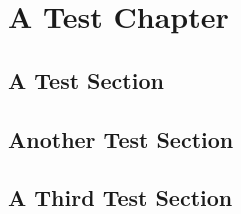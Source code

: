 \newcommand{\thetitle}{The Great Project\\ And How to Typeset it}
\newcommand{\thegroup}{Group XXXX}
\newcommand{\theauthors}{
	Anders Andersen\\
	Anders Andersen\\
	Anders Andersen\\
	Anders Andersen
}
\newcommand{\thesupervisor}{Your Supervisor}
\newcommand{\thestudy}{Your Study}
\newcommand{\thetheme}{Your Theme}
\newcommand{\theprojectperiod}{Spring / Summer}
\newcommand{\deadline}{\today}





\chapter{A Test Chapter}
\lipsum[1]

\section{A Test Section}
\lipsum[2] \parencite{goossens93}

\lipsum[3]

\section{Another Test Section}
\lipsum[4]

\section{A Third Test Section}
\lipsum[5] \parencite{greenwade93}

\printbibliography[
	heading=bibintoc         %
	,title={Litteraturliste}%
]
